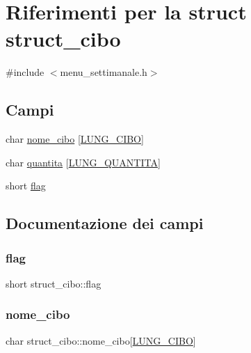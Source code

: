 \hypertarget{structstruct__cibo}{}\section{Riferimenti per la struct struct\+\_\+cibo}
\label{structstruct__cibo}


{\ttfamily \#include $<$menu\+\_\+settimanale.\+h$>$}

\subsection*{Campi}
\begin{DoxyCompactItemize}
\item 
char \hyperlink{structstruct__cibo_aa44460f9c88f17f237bf85ca968cfff6}{nome\+\_\+cibo} \mbox{[}\hyperlink{menu__settimanale_8h_a09e34227c2761b85eaf76cc08972af12}{L\+U\+N\+G\+\_\+\+C\+I\+BO}\mbox{]}
\item 
char \hyperlink{structstruct__cibo_a32ea9e1a1f09a5f23de656236b0f9616}{quantita} \mbox{[}\hyperlink{menu__settimanale_8h_af69c340c57cfdd29bd5cec6848afbf16}{L\+U\+N\+G\+\_\+\+Q\+U\+A\+N\+T\+I\+TA}\mbox{]}
\item 
short \hyperlink{structstruct__cibo_a26153c9465821a8e6b4b2b86ea209fbf}{flag}
\end{DoxyCompactItemize}


\subsection{Documentazione dei campi}
\mbox{\label{structstruct__cibo_a26153c9465821a8e6b4b2b86ea209fbf}} 
\subsubsection{\texorpdfstring{flag}{flag}}
{\footnotesize\ttfamily short struct\+\_\+cibo\+::flag}

\mbox{\label{structstruct__cibo_aa44460f9c88f17f237bf85ca968cfff6}} 
\subsubsection{\texorpdfstring{nome\+\_\+cibo}{nome\_cibo}}
{\footnotesize\ttfamily char struct\+\_\+cibo\+::nome\+\_\+cibo\mbox{[}\hyperlink{menu__settimanale_8h_a09e34227c2761b85eaf76cc08972af12}{L\+U\+N\+G\+\_\+\+C\+I\+BO}\mbox{]}}

